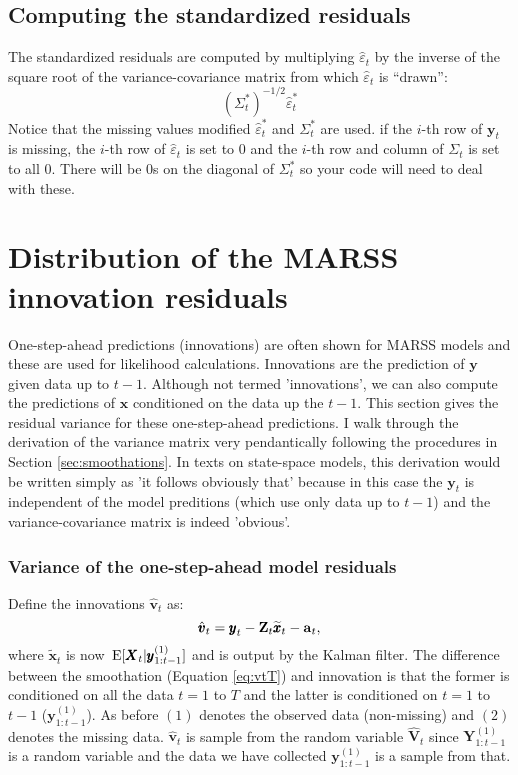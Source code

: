 \documentclass[]{article}
\def\XI{\mbox{\boldmath $\Xi$}}
\def\E{\,\textup{\textrm{E}}}
\def\VV{\mbox{$\pmb{V}$}}	\def\vv{\mbox{$\pmb{v}$}}
\def\XX{\mbox{$\pmb{X}$}}	\def\xx{\mbox{$\pmb{x}$}}
\def\YY{\mbox{$\pmb{Y}$}}	\def\yy{\mbox{$\pmb{y}$}}
\def\ZZ{\mbox{$\mathbf Z$}}	\def\zz{\mbox{$\mathbf z$}}	\def\Zb{\mbox{$\mathbf M$}} \def\Za{\mbox{$\mathbf N$}} \def\Zm{\XI}
\def\hatxt{\widetilde{\xx}_t}
\begin{document}
\subsection{Computing the standardized residuals}
The standardized residuals are computed by multiplying $\hat{\varepsilon}_t$ by the inverse of the square root of the variance-covariance matrix from which $\hat{\varepsilon}_t$ is ``drawn'':
\begin{equation}
(\Sigma_t^*)^{-1/2}\hat{\varepsilon}_t^*
\end{equation}
Notice that the missing values modified $\hat{\varepsilon}_t^*$ and $\Sigma_t^*$ are used. if the $i$-th row of $\yy_t$ is missing, the $i$-th row of $\hat{\varepsilon}_t$ is set to 0 and the $i$-th row and column of $\Sigma_t$ is set to all 0.
There will be 0s on the diagonal of $\Sigma_t^*$ so your code will need to deal with these.

\section{Distribution of the MARSS innovation residuals}

One-step-ahead predictions (innovations) are often shown for MARSS models and these are used for likelihood calculations. Innovations are the prediction of $\mathbf{y}$ given data up to $t-1$. Although not termed 'innovations', we can also compute the predictions of $\mathbf{x}$ conditioned on the data up the $t-1$. This section gives the residual variance for these one-step-ahead predictions. I walk through the derivation of the variance matrix very pendantically following the procedures in Section \ref{sec:smoothations}. In texts on state-space models, this derivation would be written simply as 'it follows obviously that' because in this case the $\yy_t$ is independent of the model preditions (which use only data up to $t-1$) and the variance-covariance matrix is indeed 'obvious'.

\subsubsection{Variance of the one-step-ahead model residuals}

Define the innovations $\hat{\vv}_t$ as:
\begin{equation}\label{eq:vtt1}
\hat{\vv}_t = \yy_t - \ZZ_t\hatxt - \aa_t,
\end{equation}
where  $\hatxt$ is now $\E[\XX_t|\yy^{(1)}_{1:t-1}]$ and is output by the Kalman filter. The difference between the smoothation (Equation \ref{eq:vtT}) and innovation is that the former is conditioned on all the data $t=1$ to $T$ and the latter is conditioned on $t=1$ to $t-1$ ($\yy^{(1)}_{1:t-1}$). As before $(1)$ denotes the observed data (non-missing) and $(2)$ denotes the missing data.  $\hat{\vv}_t$ is sample from the random variable $\hat{\VV}_t$ since $\YY^{(1)}_{1:t-1}$ is a random variable and the data we have collected $\yy^{(1)}_{1:t-1}$ is a sample from that. 
\end{document}
